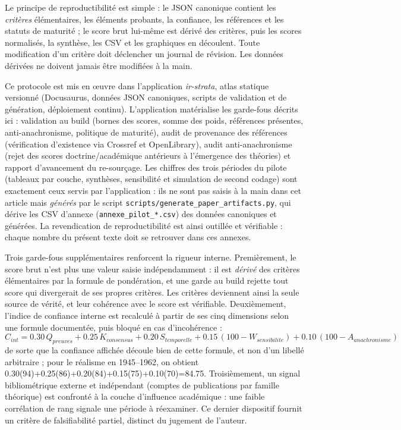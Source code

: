 \documentclass[11pt,a4paper]{article}
\begin{document}
Le principe de reproductibilité est simple : le JSON canonique contient les \emph{critères} élémentaires, les éléments probants, la confiance, les références et les statuts de maturité ; le score brut lui-même est dérivé des critères, puis les scores normalisés, la synthèse, les CSV et les graphiques en découlent. Toute modification d'un critère doit déclencher un journal de révision. Les données dérivées ne doivent jamais être modifiées à la main.

Ce protocole est mis en œuvre dans l'application \emph{ir-strata}, atlas statique versionné (Docusaurus, données JSON canoniques, scripts de validation et de génération, déploiement continu). L'application matérialise les garde-fous décrits ici : validation au build (bornes des scores, somme des poids, références présentes, anti-anachronisme, politique de maturité), audit de provenance des références (vérification d'existence via Crossref et OpenLibrary), audit anti-anachronisme (rejet des scores doctrine/académique antérieurs à l'émergence des théories) et rapport d'avancement du re-sourçage. Les chiffres des trois périodes du pilote (tableaux par couche, synthèses, sensibilité et simulation de second codage) sont exactement ceux servis par l'application : ils ne sont pas saisis à la main dans cet article mais \emph{générés} par le script \texttt{scripts/generate\_paper\_artifacts.py}, qui dérive les CSV d'annexe (\texttt{annexe\_pilot\_*.csv}) des données canoniques et générées. La revendication de reproductibilité est ainsi outillée et vérifiable : chaque nombre du présent texte doit se retrouver dans ces annexes.

Trois garde-fous supplémentaires renforcent la rigueur interne. Premièrement, le score brut n'est plus une valeur saisie indépendamment : il est \emph{dérivé} des critères élémentaires par la formule de pondération, et une garde au build rejette tout score qui divergerait de ses propres critères. Les critères deviennent ainsi la seule source de vérité, et leur cohérence avec le score est vérifiable. Deuxièmement, l'indice de confiance interne est recalculé à partir de ses cinq dimensions selon une formule documentée, puis bloqué en cas d'incohérence :
\[
C_{int}=0.30\,Q_{preuves}+0.25\,K_{consensus}+0.20\,S_{temporelle}+0.15\,(100-W_{sensibilite})+0.10\,(100-A_{anachronisme})
\]
de sorte que la confiance affichée découle bien de cette formule, et non d'un libellé arbitraire ; pour le réalisme en 1945--1962, on obtient 0.30(94)+0.25(86)+0.20(84)+0.15(75)+0.10(70)=84.75. Troisièmement, un signal bibliométrique externe et indépendant (comptes de publications par famille théorique) est confronté à la couche d'influence académique : une faible corrélation de rang signale une période à réexaminer. Ce dernier dispositif fournit un critère de falsifiabilité partiel, distinct du jugement de l'auteur.
\end{document}
